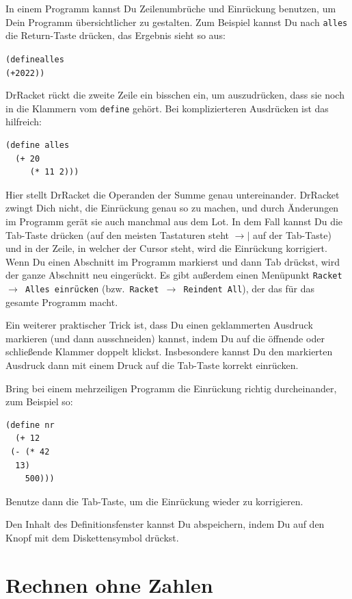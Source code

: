 In einem Programm kannst Du Zeilenumbrüche und Einrückung benutzen, um
Dein Programm übersichtlicher zu gestalten.  Zum Beispiel kannst Du
nach \texttt{alles} die Return-Taste drücken, das Ergebnis sieht so
aus:
%
\begin{alltt}
(define alles
  (+ 20 22))
\end{alltt}
%
DrRacket rückt die zweite Zeile ein bisschen ein, um auszudrücken,
dass sie noch in die Klammern vom \texttt{define} gehört.  Bei
komplizierteren Ausdrücken ist das hilfreich:
%
\begin{verbatim}
(define alles
  (+ 20
     (* 11 2)))
\end{verbatim}
%
Hier stellt DrRacket die Operanden der Summe genau untereinander.
DrRacket zwingt Dich nicht, die Einrückung genau so zu machen, und
durch Änderungen im Programm gerät sie auch manchmal aus dem Lot.  In
dem Fall kannst Du die Tab-Taste drücken (auf den meisten Tastaturen
steht $\longrightarrow\mid$ auf der Tab-Taste) und in der Zeile, in
welcher der Cursor steht, wird die Einrückung korrigiert.
Wenn Du einen Abschnitt im Programm markierst und dann Tab drückst,
wird der ganze Abschnitt neu eingerückt.  
Es gibt
außerdem einen Menüpunkt \texttt{Racket $\rightarrow$ Alles einrücken} (bzw.\
\texttt{Racket $\rightarrow$ Reindent All}), der das für das gesamte
Programm macht.

Ein weiterer praktischer Trick ist, dass Du einen geklammerten
Ausdruck markieren (und dann ausschneiden) kannst, indem Du auf die
öffnende oder schließende Klammer doppelt klickst.  Insbesondere
kannst Du den markierten Ausdruck dann mit einem Druck auf die
Tab-Taste korrekt einrücken.

\begin{aufgabeinline}
  Bring bei einem mehrzeiligen Programm die Einrückung richtig
  durcheinander, zum Beispiel so:
\begin{verbatim}
(define nr
  (+ 12
 (- (* 42
  13)
    500)))
\end{verbatim}
  Benutze dann die Tab-Taste, um die Einrückung wieder zu korrigieren.
\end{aufgabeinline}
%
Den Inhalt des Definitionsfenster kannst Du abspeichern, indem Du auf
den Knopf mit dem Diskettensymbol
 drückst.

\section{Rechnen ohne Zahlen}

